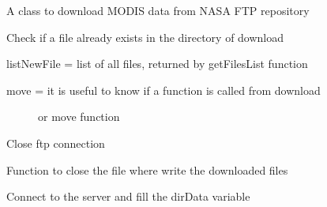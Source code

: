 \documentclass[a4paper,11pt,oneside]{sphinxmanual}
\begin{document}
\begin{fulllineitems}
\label{pymodis/pymodis:pymodis.downmodis.downModis}
A class to download MODIS data from NASA FTP repository

\begin{fulllineitems}
\label{pymodis/pymodis:pymodis.downmodis.downModis.checkDataExist}
Check if a file already exists in the directory of download

listNewFile = list of all files, returned by getFilesList function
\begin{description}
\item[{move = it is useful to know if a function is called from download}] \leavevmode
or move function

\end{description}

\end{fulllineitems}


\begin{fulllineitems}
\label{pymodis/pymodis:pymodis.downmodis.downModis.closeFTP}
Close ftp connection

\end{fulllineitems}


\begin{fulllineitems}
\label{pymodis/pymodis:pymodis.downmodis.downModis.closeFilelist}
Function to close the file where write the downloaded files

\end{fulllineitems}


\begin{fulllineitems}
\label{pymodis/pymodis:pymodis.downmodis.downModis.connect}
Connect to the server and fill the dirData variable


\end{fulllineitems}
\end{fulllineitems}
\end{document}

